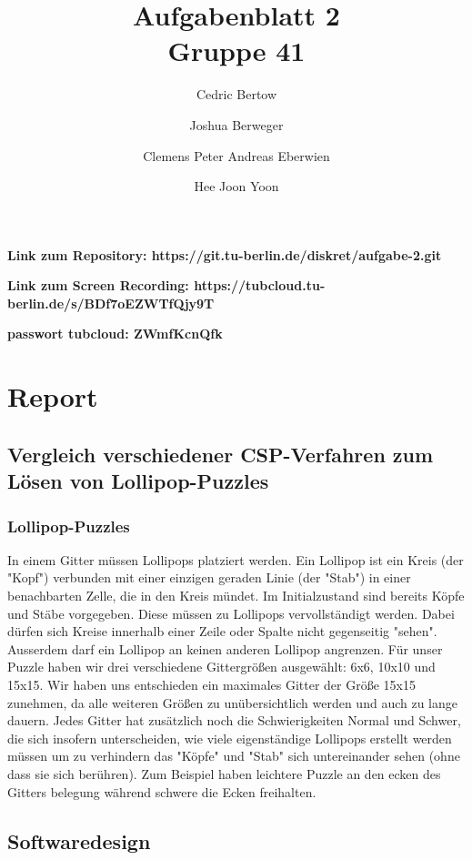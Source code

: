 \documentclass{article}
\title{Aufgabenblatt 2 \\ Gruppe 41}
\author{
    Cedric Bertow
    \and
    Joshua Berweger
    \and
    Clemens Peter Andreas Eberwien
    \and
    Hee Joon Yoon
}
\date{}
\begin{document}
\maketitle

\textbf{Link zum Repository: https://git.tu-berlin.de/diskret/aufgabe-2.git}

 

\textbf{Link zum Screen Recording: https://tubcloud.tu-berlin.de/s/BDf7oEZWTfQjy9T}



\textbf{passwort tubcloud: ZWmfKcnQfk} 

\newpage

\section{Report}

\subsection{Vergleich verschiedener CSP-Verfahren zum Lösen von Lollipop-Puzzles}

\subsubsection{Lollipop-Puzzles}

In einem Gitter müssen Lollipops platziert werden.
Ein Lollipop ist ein Kreis (der "Kopf") verbunden mit
einer einzigen geraden Linie (der "Stab") in einer benachbarten Zelle, die in den Kreis mündet.
Im Initialzustand sind bereits Köpfe und Stäbe vorgegeben. Diese müssen zu Lollipops vervollständigt
werden. Dabei dürfen sich Kreise innerhalb einer Zeile oder Spalte nicht gegenseitig "sehen". Ausserdem darf 
ein Lollipop an keinen anderen Lollipop angrenzen. 
Für unser Puzzle haben wir drei verschiedene Gittergrößen ausgewählt: 6x6, 10x10 und 15x15. 
Wir haben uns entschieden ein maximales Gitter der Größe 15x15 zunehmen, da alle weiteren Größen zu unübersichtlich werden und
auch zu lange dauern. 
Jedes Gitter hat zusätzlich noch die Schwierigkeiten Normal und Schwer, die sich insofern unterscheiden, wie viele 
eigenständige Lollipops erstellt werden müssen um zu verhindern das "Köpfe" und "Stab" sich untereinander sehen (ohne dass sie sich berühren).
Zum Beispiel haben leichtere Puzzle an den ecken des Gitters belegung während schwere die Ecken freihalten.

\newpage
\subsection{Softwaredesign}
\end{document}
